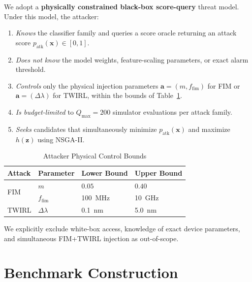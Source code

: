 \documentclass[journal,twocolumn]{IEEEtran}
\newcommand{\vx}{\mathbf{x}}
\newcommand{\va}{\mathbf{a}}
\newcommand{\vz}{\mathbf{z}}
\newcommand{\patk}{p_{\mathrm{atk}}}
\newcommand{\hobs}{h(\vz)}
\begin{document}
We adopt a \textbf{physically constrained black-box score-query} threat model.
Under this model, the attacker:
\begin{enumerate}
  \item \textit{Knows} the classifier family and queries a score oracle returning an attack score $\patk(\vx) \in [0,1]$.
  \item \textit{Does not know} the model weights, feature-scaling parameters, or exact alarm threshold.
  \item \textit{Controls} only the physical injection parameters $\va = (m, f_\mathrm{fim})$ for FIM or $\va = (\Delta\lambda)$ for TWIRL, within the bounds of Table~\ref{tab:attack_bounds}.
  \item \textit{Is budget-limited} to $Q_\mathrm{max} = 200$ simulator evaluations per attack family.
  \item \textit{Seeks} candidates that simultaneously minimize $\patk(\vx)$ and maximize $\hobs$ using NSGA-II.
\end{enumerate}

\begin{table}[t]
  \centering
  \caption{Attacker Physical Control Bounds}
  \label{tab:attack_bounds}
  \renewcommand{\arraystretch}{1.15}
  \begin{tabular}{@{}llll@{}}
    \toprule
    Attack & Parameter & Lower Bound & Upper Bound \\
    \midrule
    \multirow{2}{*}{FIM}
      & $m$          & $0.05$           & $0.40$ \\
      & $f_\mathrm{fim}$ & \SI{100}{\mega\hertz} & \SI{10}{\giga\hertz} \\[2pt]
    TWIRL
      & $\Delta\lambda$ & \SI{0.1}{\nano\metre} & \SI{5.0}{\nano\metre} \\
    \bottomrule
  \end{tabular}
\end{table}

We explicitly exclude white-box access, knowledge of exact device parameters, and
simultaneous FIM+TWIRL injection as out-of-scope.

\section{Benchmark Construction}
\label{sec:benchmark}
\end{document}
